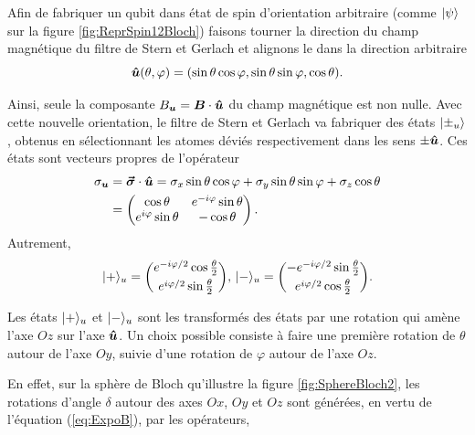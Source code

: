 Afin de fabriquer un qubit dans état de spin d'orientation arbitraire (comme
$\vert\psi\rangle$ sur la figure \ref{fig:ReprSpin12Bloch}) faisons tourner la
direction du champ magnétique du filtre de Stern et Gerlach et alignons le dans
la direction arbitraire
\begin{equation}
\boldsymbol{\hat{u}}(\theta,\varphi)=(\sin\theta\cos\varphi,
\sin\theta\sin\varphi,\cos\theta).
\end{equation}

Ainsi, seule la composante $B_{\boldsymbol{u}}=\boldsymbol{B}\cdot\boldsymbol{\hat{u}}$ du champ
magnétique est non nulle. Avec cette nouvelle orientation, le filtre de Stern et
Gerlach va fabriquer des états $\vert\pm_{u}\rangle$, obtenus en sélectionnant les
atomes déviés respectivement dans les sens $\pm \boldsymbol{\hat{u}}$. Ces états sont
vecteurs propres de l'opérateur%
\begin{equation}
\begin{split}
\sigma_{\boldsymbol{u}} & =\boldsymbol{\vec{\sigma}}\cdot\boldsymbol{\hat{u}}
=\sigma_{x}\sin\theta\cos\varphi+\sigma_{y}\sin\theta\sin\varphi+\sigma_z
\cos\theta\\
& =\begin{pmatrix}
\cos\theta & e^{-i\varphi}\sin\theta\\
e^{i\varphi}\sin\theta & -\cos\theta
\end{pmatrix}.
\end{split}
\end{equation}
Autrement,
\begin{equation}
\vert+\rangle_{u}=\binom{e^{-i\varphi/2}\cos\frac{\theta}{2}}{e^{i\varphi/2}\sin\frac{
\theta}{2}},\,\vert-\rangle_{u}=\binom{-e^{-i\varphi/2}\sin\frac{\theta}{2}}{e^{
i\varphi/2}\cos\frac{\theta}{2}}.
\end{equation}

Les états $\vert+\rangle_{u}$ et $\vert-\rangle_{u}$ sont les transformés des états par une
rotation qui amène l'axe $Oz$ sur l'axe $\boldsymbol{\hat{u}}$. Un choix possible
consiste à faire une première rotation de $\theta$ autour de l'axe $Oy$, suivie
d'une rotation de $\varphi$ autour de l'axe $Oz$.

En effet, sur la sphère de Bloch qu'illustre la figure \ref{fig:SphereBloch2},
les rotations d'angle $\delta$ autour des axes $Ox$, $Oy$ et $Oz$ sont générées,
en vertu de l'équation (\ref{eq:ExpoB}), par les opérateurs,%

